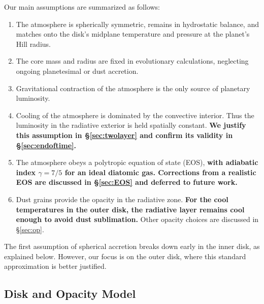 \documentclass[apj, numberedappendix]{emulateapj}
\begin{document}
Our main assumptions are summarized as follows:
\begin{enumerate}
\item The atmosphere is spherically symmetric, remains in hydrostatic balance, and matches onto the disk's midplane temperature and pressure at the planet's Hill radius.
\item The core mass and radius are fixed in evolutionary calculations, neglecting ongoing planetesimal or dust accretion.
\item Gravitational contraction of the atmosphere is the only source of planetary luminosity.  
\item Cooling of the atmosphere is dominated by the convective interior.  Thus the luminosity in the radiative exterior is held spatially constant. \textbf{We justify this assumption in \S\ref{sec:twolayer} and confirm its validity in \S\ref{sec:endoftime}.} 
\item The atmosphere obeys a polytropic equation of state (EOS), \textbf{with adiabatic index $\gamma = 7/5$ for an ideal diatomic gas.  Corrections from a realistic EOS are discussed in \S\ref{sec:EOS} and deferred to future work.}
\item Dust grains provide the opacity in the radiative zone. \textbf{For the cool temperatures in the outer disk, the radiative layer remains cool enough to avoid dust sublimation.} Other opacity choices are discussed in \S\ref{sec:op}.
\end{enumerate}

The first assumption of spherical accretion breaks down early in the inner disk, as explained below.  However, our focus is on the outer disk, where this standard approximation is better justified.

\subsection{Disk and Opacity Model}\label{sec:disk}
\end{document}
